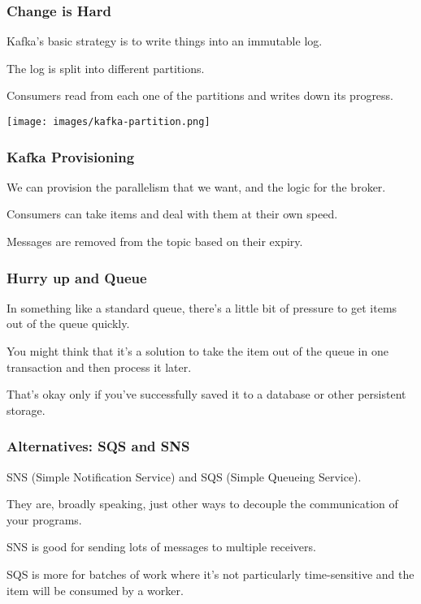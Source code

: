 \begin{frame}
\frametitle{Change is Hard}

Kafka's basic strategy is to write things into an immutable log. 

The log is split into different partitions.

Consumers read from each one of the partitions and writes down its progress.

\begin{center}
	\texttt{[image: images/kafka-partition.png]}
\end{center}


\end{frame}


\begin{frame}
\frametitle{Kafka Provisioning}

We can provision the parallelism that we want, and the logic for the broker.

Consumers can take items and deal with them at their own speed.

Messages are removed from the topic based on their expiry.

\end{frame}


\begin{frame}
\frametitle{Hurry up and Queue}

In something like a standard queue, there's a little bit of pressure to get items out of the queue quickly.

You might think that it's a solution to take the item out of the queue in one transaction and then process it later.

That's okay only if you've successfully saved it to a database or other persistent storage. 

\end{frame}


\begin{frame}
\frametitle{Alternatives: SQS and SNS}

SNS (Simple Notification Service) and SQS (Simple Queueing Service). 

They are, broadly speaking, just other ways to decouple the communication of your programs.

SNS is good for sending lots of messages to multiple receivers.

SQS is more for batches of work where it's not particularly time-sensitive and the item will be consumed by a worker.

\end{frame}


